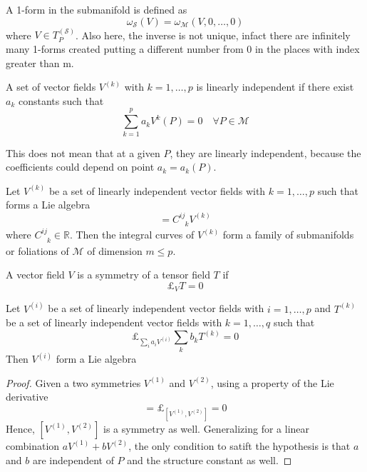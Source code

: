     A 1-form in the submanifold is defined as 
    \begin{equation*}
        \omega_{\mathcal S} (V) = \omega_{\mathcal M} (V, 0, \ldots, 0)
    \end{equation*}
    where $V \in T_P^{(\mathcal S)}$. Also here, the inverse is not unique, infact there are infinitely many 1-forms created putting a different number from $0$ in the places with index greater than m. 

    A set of vector fields $V^{(k)}$ with $k = 1, \ldots, p$ is linearly independent if there exist $a_k$ constants such that
    \begin{equation*}
        \sum_{k=1}^{p} a_k V^k (P) = 0 \quad \forall P \in \mathcal M 
    \end{equation*}

    This does not mean that at a given $P$, they are linearly independent, because the coefficients could depend on point $a_k = a_k (P)$.

    \begin{theorem}[Frobenius]
        Let $V^{(k)}$ be a set of linearly independent vector fields with $k = 1, \ldots, p$ such that forms a Lie algebra
        \begin{equation*}
            [V^{(i)},V^{(j)}] = C^{ij}_{\phantom{ij} k} V^{(k)}
        \end{equation*}
        where $C^{ij}_{\phantom{ij} k} \in \mathbb R$. Then the integral curves of $V^{(k)}$ form a family of submanifolds or foliations of $\mathcal M$ of dimension $m \leq p$.
    \end{theorem}

    A vector field $V$ is a symmetry of a tensor field $T$ if 
    \begin{equation*}
        \pounds_V T = 0
    \end{equation*}

    \begin{theorem}
        Let $V^{(i)}$ be a set of linearly independent vector fields with $i = 1, \ldots, p$ and $T^{(k)}$ be a set of linearly independent vector fields with $k = 1, \ldots, q$ such that 
        \begin{equation*}
            \pounds_{\sum_i a_i V^{(i)}} \sum_k b_k T^{(k)} = 0
        \end{equation*}
        Then $V^{(i)}$ form a Lie algebra
    \end{theorem}

    \begin{proof}
        Given a two symmetries $V^{(1)}$ and $V^{(2)}$, using a property of the Lie derivative
        \begin{equation*}
            [\pounds_{V^{(1)}}, \pounds_{V^{(2)}}] = \pounds_{[V^{(1)},V^{(2)}]} = 0
        \end{equation*}
        Hence, $[V^{(1)},V^{(2)}]$ is a symmetry as well. Generalizing for a linear combination $aV^{(1)} + bV^{(2)}$, the only condition to satift the hypothesis is that $a$ and $b$ are independent of $P$ and the structure constant as well. 
    \end{proof}

